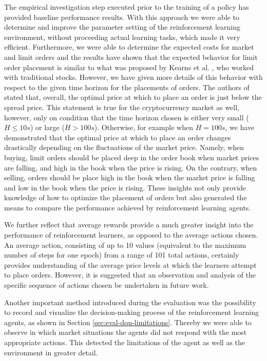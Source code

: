     The empirical investigation step executed prior to the training of a policy has provided baseline performance results.
    With this approach we were able to determine and improve the parameter setting of the reinforcement learning environment, without proceeding actual learning tasks, which made it very efficient.
    Furthermore, we were able to determine the expected costs for market and limit orders and the results have shown that the expected behavior for limit order placement is similar to what was proposed by Kearns et al. \cite{nevmyvaka2005electronic}, who worked with traditional stocks.
    However, we have given more details of this behavior with respect to the given time horizon for the placements of orders.
    The authors of \cite{nevmyvaka2005electronic} stated that, overall, the optimal price at which to place an order is just below the spread price.
    This statement is true for the cryptocurrency market as well, however, only on condition that the time horizon chosen is either very small ($H\leq10s$) or large ($H>100s$).
    Otherwise, for example when $H=100s$, we have demonstrated that the optimal price at which to place an order changes drastically depending on the fluctuations of the market price.
    Namely, when buying, limit orders should be placed deep in the order book when market prices are falling, and high in the book when the price is rising.
    On the contrary, when selling, orders should be place high in the book when the market price is falling and low in the book when the price is rising.
    These insights not only provide knowledge of how to optimize the placement of orders but also generated the means to compare the performance achieved by reinforcement learning agents.
    
    We further reflect that average rewards provide a much greater insight into the performance of reinforcement learners, as opposed to the average actions chosen.
    An average action, consisting of up to 10 values (equivalent to the maximum number of steps for one epoch) from a range of 101 total actions, certainly provides understanding of the average price levels at which the learners attempt to place orders.
    However, it is suggested that an observation and analysis of the specific sequence of actions chosen be undertaken in future work.
    
    Another important method introduced during the evaluation was the possibility to record and visualize the decision-making process of the reinforcement learning agents, as shown in Section \ref{sec:eval-dqn-limitations}.
    Thereby we were able to observe in which market situations the agents did not respond with the most appropriate actions.
    This detected the limitations of the agent as well as the environment in greater detail.
    

